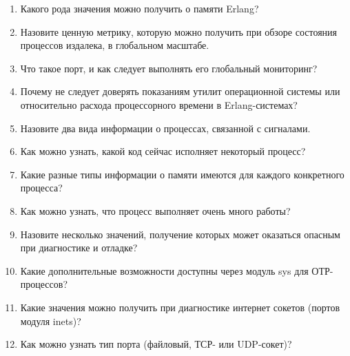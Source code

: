 \begin{enumerate}
	\item Какого рода значения можно получить о памяти Erlang?
	\item Назовите ценную метрику, которую можно получить при обзоре состояния процессов издалека, в глобальном масштабе.
	\item Что такое порт, и как следует выполнять его глобальный мониторинг?
	\item Почему не следует доверять показаниям утилит операционной системы  или  относительно расхода процессорного времени в Erlang-системах?
	\item Назовите два вида информации о процессах, связанной с сигналами.
	\item Как можно узнать, какой код сейчас исполняет некоторый процесс?
	\item Какие разные типы информации о памяти имеются для каждого конкретного процесса?
	\item Как можно узнать, что процесс выполняет очень много работы?
	\item Назовите несколько значений, получение которых может оказаться опасным при диагностике и отладке?
	\item Какие дополнительные возможности доступны через модуль sys для ОТР-процессов?
	\item Какие значения можно получить при диагностике интернет сокетов (портов модуля inets)?
	\item Как можно узнать тип порта (файловый, ТСР- или UDP-сокет)?
\end{enumerate}


